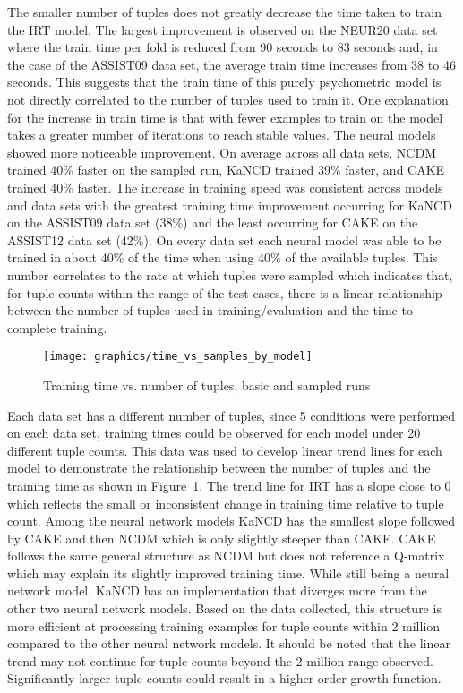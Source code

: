 \documentclass[letterpaper, 12pt, captions=tableabove]{scrreprt}
\begin{document}
		The smaller number of tuples does not greatly decrease the time taken to train the IRT model. The largest improvement is observed on the NEUR20 data set where the train time per fold is reduced from 90 seconds to 83 seconds and, in the case of the ASSIST09 data set, the average train time increases from 38 to 46 seconds. This suggests that the train time of this purely psychometric model is not directly correlated to the number of tuples used to train it. One explanation for the increase in train time is that with fewer examples to train on the model takes a greater number of iterations to reach stable values. The neural models showed more noticeable improvement. On average across all data sets, NCDM trained 40\% faster on the sampled run, KaNCD trained 39\% faster, and CAKE trained 40\% faster. The increase in training speed was consistent across models and data sets with the greatest training time improvement occurring for KaNCD on the ASSIST09 data set (38\%) and the least occurring for CAKE on the ASSIST12 data set (42\%). On every data set each neural model was able to be trained in about 40\% of the time when using 40\% of the available tuples. This number correlates to the rate at which tuples were sampled which indicates that, for tuple counts within the range of the test cases, there is a linear relationship between the number of tuples used in training/evaluation and the time to complete training.
		\begin{figure}[htbp]
			\centering
			\texttt{[image: graphics/time\_vs\_samples\_by\_model]}
			\captionsetup{justification=centering}
			\caption{Training time vs. number of tuples, basic and sampled runs}
			\label{fig:timeVsTuples}
		\end{figure}
		Each data set has a different number of tuples, since 5 conditions were performed on each data set, training times could be observed for each model under 20 different tuple counts. This data was used to develop linear trend lines for each model to demonstrate the relationship between the number of tuples and the training time as shown in Figure~\ref{fig:timeVsTuples}. The trend line for IRT has a slope close to 0 which reflects the small or inconsistent change in training time relative to tuple count. Among the neural network models KaNCD has the smallest slope followed by CAKE and then NCDM which is only slightly steeper than CAKE. CAKE follows the same general structure as NCDM but does not reference a Q-matrix which may explain its slightly improved training time. While still being a neural network model, KaNCD has an implementation that diverges more from the other two neural network models. Based on the data collected, this structure is more efficient at processing training examples for tuple counts within 2 million compared to the other neural network models. It should be noted that the linear trend may not continue for tuple counts beyond the 2 million range observed. Significantly larger tuple counts could result in a higher order growth function.
		
\end{document}
